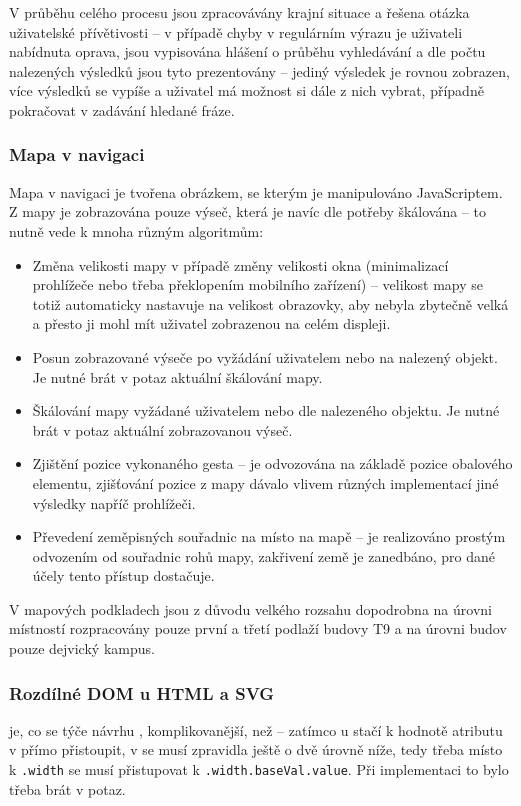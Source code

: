 V průběhu celého procesu jsou zpracovávány krajní situace a řešena otázka uživatelské přívětivosti -- v případě chyby v regulárním výrazu je uživateli nabídnuta oprava, jsou vypisována hlášení o průběhu vyhledávání a dle počtu nalezených výsledků jsou tyto prezentovány -- jediný výsledek je rovnou zobrazen, více výsledků se vypíše a uživatel má možnost si dále z nich vybrat, případně pokračovat v zadávání hledané fráze.

\subsubsection{Mapa v navigaci}
Mapa v navigaci je tvořena  obrázkem, se kterým je manipulováno JavaScriptem. Z mapy je zobrazována pouze výseč, která je navíc dle potřeby škálována -- to nutně vede k mnoha různým algoritmům:
\begin{itemize}
 \item Změna velikosti mapy v případě změny velikosti okna (minimalizací prohlížeče nebo třeba překlopením mobilního zařízení) -- velikost mapy se totiž automaticky nastavuje na velikost obrazovky, aby nebyla zbytečně velká a přesto ji mohl mít uživatel zobrazenou na celém displeji.
 \item Posun zobrazované výseče po vyžádání uživatelem nebo na nalezený objekt. Je nutné brát v potaz aktuální škálování mapy.
 \item Škálování mapy vyžádané uživatelem nebo dle nalezeného objektu. Je nutné brát v potaz aktuální zobrazovanou výseč.
 \item Zjištění pozice vykonaného gesta -- je odvozována na základě pozice obalového elementu, zjišťování pozice z mapy dávalo vlivem různých implementací jiné výsledky napříč prohlížeči.
 \item Převedení zeměpisných souřadnic na místo na mapě -- je realizováno prostým odvozením od souřadnic rohů mapy, zakřivení země je zanedbáno, pro dané účely tento přístup dostačuje.
\end{itemize}
V mapových podkladech jsou z důvodu velkého rozsahu dopodrobna na úrovni místností rozpracovány pouze první a třetí podlaží budovy T9 a na úrovni budov pouze dejvický kampus.


\subsubsection{Rozdílné DOM u HTML a SVG}
 je, co se týče návrhu , komplikovanější, než  -- zatímco u  stačí k hodnotě atributu v  přímo přistoupit, v  se musí zpravidla ještě o dvě úrovně níže, tedy třeba místo k \texttt{.width} se musí přistupovat k \texttt{.width.baseVal.value}. Při implementaci to bylo třeba brát v potaz.

